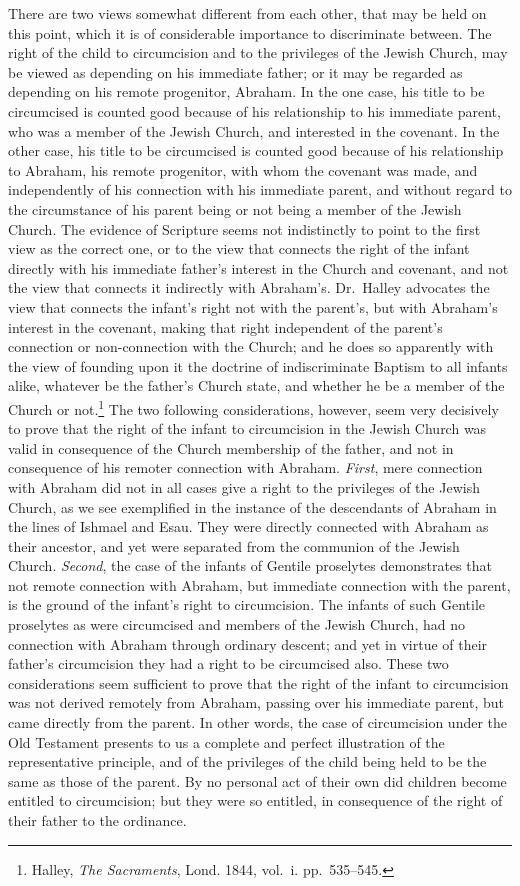\documentclass[
  english,
]{book}
\begin{document}
There are two views somewhat different from each other, that may be held on this point, which it is of considerable importance to discriminate between. The right of the child to circumcision and to the privileges of the Jewish Church, may be viewed as depending on his immediate father; or it may be regarded as depending on his remote progenitor, Abraham. In the one case, his title to be circumcised is counted good because of his relationship to his immediate parent, who was a member of the Jewish Church, and interested in the covenant. In the other case, his title to be circumcised is counted good because of his relationship to Abraham, his remote progenitor, with whom the covenant was made, and independently of his connection with his immediate parent, and without regard to the circumstance of his parent being or not being a member of the Jewish Church. The evidence of Scripture seems not indistinctly to point to the first view as the correct one, or to the view that connects the right of the infant directly with his immediate father's interest in the Church and covenant, and not the view that connects it indirectly with Abraham's. Dr.~Halley advocates the view that connects the infant's right not with the parent's, but with Abraham's interest in the covenant, making that right independent of the parent's connection or non-connection with the Church; and he does so apparently with the view of founding upon it the doctrine of indiscriminate Baptism to all infants alike, whatever be the father's Church state, and whether he be a member of the Church or not.\footnote{Halley, \emph{The Sacraments}, Lond. 1844, vol.~i. pp.~535--545.} The two following considerations, however, seem very decisively to prove that the right of the infant to circumcision in the Jewish Church was valid in consequence of the Church membership of the father, and not in consequence of his remoter connection with Abraham. \emph{First}, mere connection with Abraham did not in all cases give a right to the privileges of the Jewish Church, as we see exemplified in the instance of the descendants of Abraham in the lines of Ishmael and Esau. They were directly connected with Abraham as their ancestor, and yet were separated from the communion of the Jewish Church. \emph{Second}, the case of the infants of Gentile proselytes demonstrates that not remote connection with Abraham, but immediate connection with the parent, is the ground of the infant's right to circumcision. The infants of such Gentile proselytes as were circumcised and members of the Jewish Church, had no connection with Abraham through ordinary descent; and yet in virtue of their father's circumcision they had a right to be circumcised also. These two considerations seem sufficient to prove that the right of the infant to circumcision was not derived remotely from Abraham, passing over his immediate parent, but came directly from the parent. In other words, the case of circumcision under the Old Testament presents to us a complete and perfect illustration of the representative principle, and of the privileges of the child being held to be the same as those of the parent. By no personal act of their own did children become entitled to circumcision; but they were so entitled, in consequence of the right of their father to the ordinance.
\end{document}
